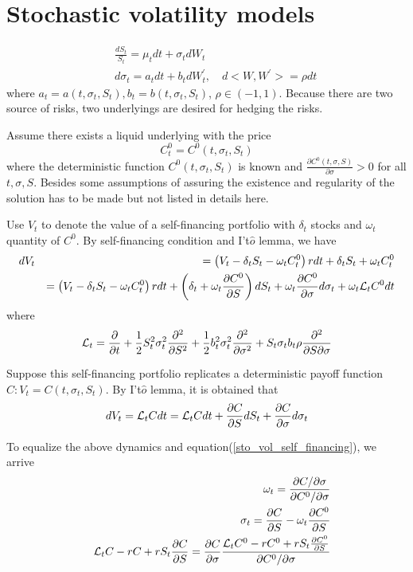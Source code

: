 \documentclass[10pt]{article}
\theoremstyle{plain}
\numberwithin{equation}{section}
\numberwithin{table}{section}
\newcommand{\s}{\sigma}
\newcommand{\om}{\omega}
\newcommand{\prt}[1]{\left( #1 \right)}  %
\newcommand{\de}{\delta}
\newcommand{\pa}{\partial}
\begin{document}
\newpage
\section{Stochastic volatility models}

\begin{eqnarray}
    &&\frac{d S_t}{S_t} = \mu_t dt + \s_t dW_t   \nonumber \\
    &&d \s_t = a_t dt + b_t d W^{'}_t, \quad d<W, W^{'}>=\rho dt
    \label{stoch_vol_sde}
\end{eqnarray}
where $a_t=a(t, \s_t, S_t), b_t=b(t, \s_t, S_t)$, $\rho \in (-1, 1)$. Because there are two source of risks, two underlyings are desired for hedging the risks. 

Assume there exists a liquid underlying with the price
\[
    C_t^0=C^0(t, \s_t, S_t)    
\]
where the deterministic function $C^0(t, \s_t, S_t)$ is known and $\frac{\pa C^0(t, \s, S)}{\pa \s} > 0$ for all $t,\s, S$. Besides some assumptions of assuring the
existence and regularity of the solution has to be made but not listed in details here.

Use $V_t$ to denote the value of a self-financing portfolio with $\de_t$ stocks and $\om_t$ quantity of $C^0$. By self-financing condition and I't$\hat{o}$ lemma, we have
\begin{eqnarray}
    dV_t &&= \prt{V_t - \de_tS_t - \om_tC^0_t} rdt + \de_tS_t + \om_tC^0_t \nonumber \\
    && =  \prt{V_t - \de_tS_t - \om_tC^0_t} rdt + \prt{\de_t + \om_t \frac{\pa C^0}{\pa S}}dS_t + \om_t \frac{\pa C^0}{\pa \s} d\s_t + \om_t {\cal{L}}_t C^0 dt
    \label{sto_vol_self_financing}
\end{eqnarray}
where 
\[
    {\cal{L}}_t = \frac{\pa}{\pa t} + \frac{1}{2} S_t^2 \s_t^2 \frac{\pa^2}{\pa S^2} + \frac{1}{2} b_t^2 \s_t^2 \frac{\pa^2}{\pa \s^2} + S_t\s_t b_t\rho \frac{\pa^2}{\pa S \pa \s}
\]

Suppose this self-financing portfolio replicates a deterministic payoff function $C: V_t =C(t, \s_t, S_t)$. By I't$\hat{o}$ lemma, it is obtained that
\[
    dV_t = {\cal{L}}_tC dt = {\cal{L}}_t C dt + \frac{\pa C}{ \pa S}dS_t + \frac{\pa C}{ \pa \s}d\s_t 
\]

To equalize the above dynamics and equation(\ref{sto_vol_self_financing}), we arrive 
\begin{eqnarray*}
    && \om_t = \frac{\pa C / \pa \s}{\pa C^0 / \pa \s}   \\
    && \s_t = \frac{\pa C}{\pa S} - \om_t \frac{\pa C^0}{\pa S}\\
    && {\cal{L}}_tC - rC + rS_t \frac{\pa C}{\pa S} = \frac{\pa C}{\pa \s}  \frac{{\cal{L}}_t C^0 - rC^0 + rS_t \frac{\pa C^0}{\pa S}}{\pa C^0 / \pa \s}
\end{eqnarray*}
\end{document}
